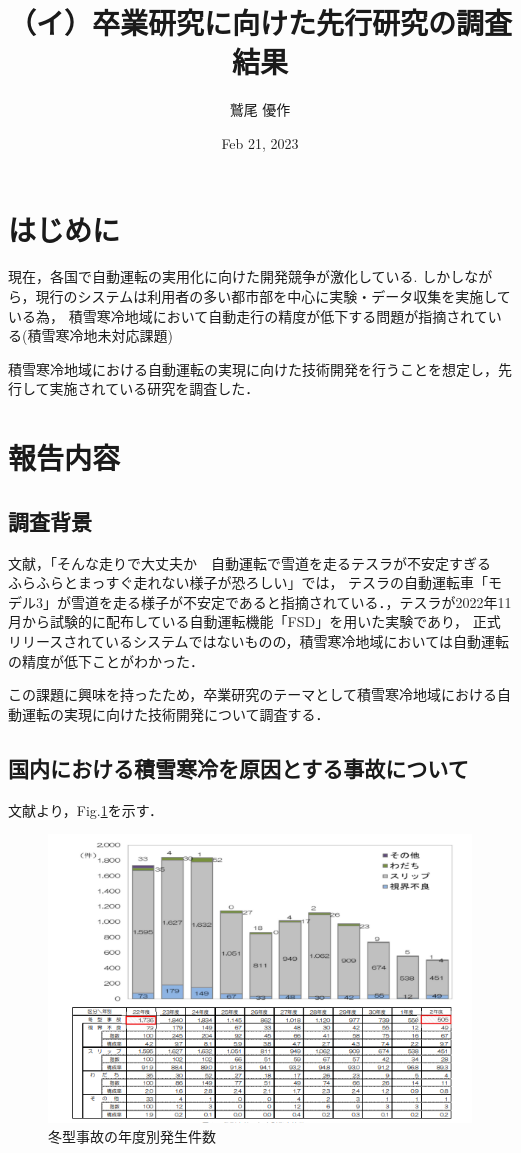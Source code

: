 \documentclass[a4paper]{jarticle}
\title{（イ）卒業研究に向けた先行研究の調査結果}
\author{鷲尾 優作}
\date{Feb 21, 2023}
\begin{document}
\maketitle
%
\section{はじめに}
%
現在，各国で自動運転の実用化に向けた開発競争が激化している.
しかしながら，現行のシステムは利用者の多い都市部を中心に実験・データ収集を実施している為，
積雪寒冷地域において自動走行の精度が低下する問題が指摘されている(積雪寒冷地未対応課題)

積雪寒冷地域における自動運転の実現に向けた技術開発を行うことを想定し，先行して実施されている研究を調査した．
%
\section{報告内容}
%
\subsection{調査背景}
文献\cite{yahoo-sonnahashiri:online}，「そんな走りで大丈夫か　自動運転で雪道を走るテスラが不安定すぎる　ふらふらとまっすぐ走れない様子が恐ろしい」では，
テスラの自動運転車「モデル3」が雪道を走る様子が不安定であると指摘されている．，テスラが2022年11月から試験的に配布している自動運転機能「FSD」を用いた実験であり，
正式リリースされているシステムではないものの，積雪寒冷地域においては自動運転の精度が低下ことがわかった．

この課題に興味を持ったため，卒業研究のテーマとして積雪寒冷地域における自動運転の実現に向けた技術開発について調査する．

\subsection{国内における積雪寒冷を原因とする事故について}
文献\cite{blizzard52:online}より，Fig.\ref{21}を示す．

\begin{figure}[H]
  \centering
  \includegraphics[width=0.6\linewidth]{picture/21.png}
  \caption{冬型事故の年度別発生件数}
  \label{21}
\end{figure}
\end{document}

